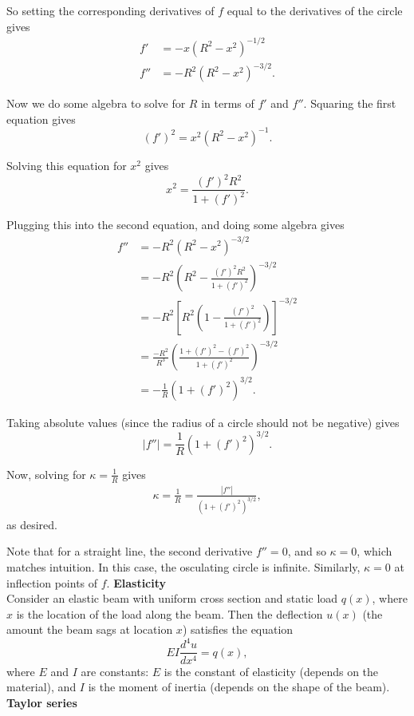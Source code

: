 \documentclass[twoside,openright,titlepage,a4paper]{book}
\begin{document}
\begin{sloppypar}
\begin{examplebox}
So setting the corresponding derivatives of $f$ equal to the derivatives of the circle gives
\begin{align*}
f' &= -x(R^2 - x^2)^{-1/2} \\
f'' &= -R^2(R^2-x^2)^{-3/2}. 
\end{align*}

Now we do some algebra to solve for $R$ in terms of $f'$ and $f''$. Squaring the first equation gives \[ (f')^2 = x^2(R^2-x^2)^{-1}. \]

Solving this equation for $x^2$ gives \[ x^2 = \frac{(f')^2 R^2}{1+(f')^2}. \]

Plugging this into the second equation, and doing some algebra gives
\begin{align*}
f'' &= -R^2(R^2-x^2)^{-3/2} \\
&= -R^2 \left( R^2 - \frac{(f')^2 R^2}{1+(f')^2} \right)^{-3/2} \\
&= -R^2 \left[ R^2 \left(1-\frac{(f')^2}{1+(f')^2} \right)\right]^{-3/2} \\
&= \frac{-R^2}{R^3} \left(\frac{1+(f')^2 - (f')^2}{1+(f')^2}\right)^{-3/2} \\
&= -\frac{1}{R} \left(1+(f')^2 \right)^{3/2}.
\end{align*}

Taking absolute values (since the radius of a circle should not be negative) gives \[ |f''| = \frac{1}{R} \left(1+(f')^2 \right)^{3/2}. \]

Now, solving for $\kappa = \frac{1}{R}$ gives
\begin{align*}
\kappa = \frac{1}{R} = \frac{|f''|}{(1+(f')^2)^{3/2}},
\end{align*}
as desired.
\end{examplebox}		

Note that for a straight line, the second derivative $f''=0$, and so $\kappa = 0$, which matches intuition. In this case, the osculating circle is infinite. Similarly, $\kappa=0$ at inflection points of $f$.
\bigbreak
\textbf{Elasticity}\\

Consider an elastic beam with uniform cross section and static load $q(x)$, where $x$ is the location of the load along the beam. Then the deflection $u(x)$ (the amount the beam sags at location $x$) satisfies the equation \[ EI \frac{d^4u}{dx^4} = q(x), \] where $E$ and $I$ are constants: $E$ is the constant of elasticity (depends on the material), and $I$ is the moment of inertia (depends on the shape of the beam).
\bigbreak
\textbf{Taylor series}\\


\end{sloppypar}
\end{document}
